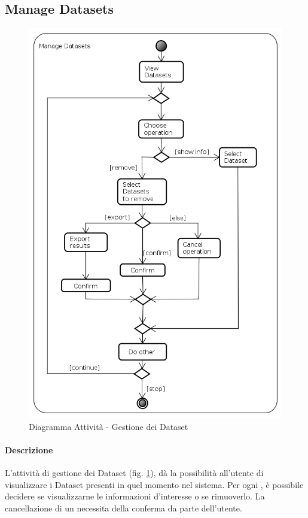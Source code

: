 \subsection{Manage Datasets}
\label{ManageDataset}
\begin{figure}[!h]
\centering
\includegraphics[width=0.85\linewidth]{./Content/Immagini/Manage_Datasets}
\caption{Diagramma Attività - Gestione dei Dataset}
\label{ManageData}
\end{figure}
\paragraph{Descrizione\\}
L'attività di gestione dei Dataset\glossario{} (fig. \ref{ManageData}), dà la possibilità all'utente di visualizzare i Dataset\glossario{} presenti in quel momento nel sistema. Per ogni \dataset{}, è possibile decidere se visualizzarne le informazioni d'interesse o se rimuoverlo. La cancellazione di un \dataset{} necessita della conferma da parte dell'utente.
\pagebreak

